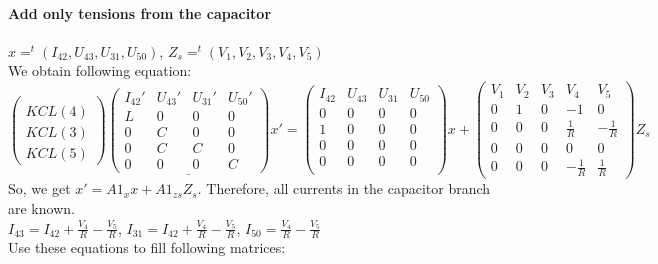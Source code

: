 \paragraph{Add only tensions from the capacitor}
$x=^{t}(I_{42},U_{43},U_{31},U_{50})$,
$Z_{s}=^{t}(V_{1},V_{2},V_{3},V_{4},V_{5})$\\
We obtain following equation:
\[
\left(\begin{array}{c}
  \\  KCL(4)\\  KCL(3)\\  KCL(5)
\end{array}\right)
\underline{
\left(\begin{array}{cccc}
  I_{42}'&U_{43}'&U_{31}'&U_{50}'\\
  \hline
L&0&0&0\\
0&C&0&0\\
0&C&C&0\\
0&0&0&C
\end{array}\right)}x'=
\left(\begin{array}{cccc}
  I_{42}&U_{43}&U_{31}&U_{50}\\
  \hline
0&0&0&0\\
1&0&0&0\\
0&0&0&0\\
0&0&0&0\\ 
\end{array}\right)x+
\left(\begin{array}{ccccc}
V_{1}&V_{2}&V_{3}&V_{4}&V_{5}\\
  \hline
  0&1&0&-1&0\\
  0&0&0&\frac{1}{R}&-\frac{1}{R}\\
  0&0&0&0&0\\
  0&0&0&-\frac{1}{R}&\frac{1}{R}
\end{array}\right)Z_{s}
\]
So, we get $x'=A1_{x}x+A1_{zs}Z_{s}$. Therefore, all currents in the capacitor branch are known.\\
$I_{43}= I_{42}+\frac{V_{4}}{R}-\frac{V_{5}}{R}$,
$I_{31}= I_{42}+\frac{V_{4}}{R}-\frac{V_{5}}{R}$,
$I_{50}= \frac{V_{4}}{R}-\frac{V_{5}}{R}$\\
Use these equations to fill following matrices:
